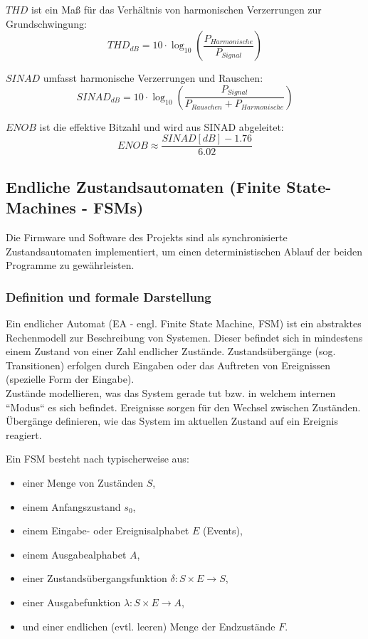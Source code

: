 \documentclass[a4paper, portrait, 12pt]{scrartcl} %
\begin{document}
\textbf{$THD$} ist ein Maß für das Verhältnis von harmonischen Verzerrungen zur Grundschwingung:
\begin{equation}
	THD_{dB}=10\cdot \log_{10}\left( \frac{P_{Harmonische}}{P_{Signal}}\right)
\end{equation}

\textbf{$SINAD$} umfasst harmonische Verzerrungen und Rauschen:
\begin{equation}
	SINAD_{dB}=10\cdot \log_{10}\left( \frac{P_{Signal}}{P_{Rauschen}+P_{Harmonische}}\right)
\end{equation}

\textbf{$ENOB$} ist die effektive Bitzahl und wird aus SINAD abgeleitet:
\begin{equation}
	ENOB\approx \frac{SINAD[dB]-1.76}{6.02}
\end{equation}





\pagebreak

\subsection{Endliche Zustandsautomaten (Finite State-Machines - FSMs)}
Die Firmware und Software des Projekts sind als synchronisierte Zustandsautomaten implementiert, um einen deterministischen Ablauf der beiden Programme zu gewährleisten.
\subsubsection{Definition und formale Darstellung}
Ein endlicher Automat (EA - engl. Finite State Machine, FSM) ist ein abstraktes Rechenmodell zur Beschreibung von Systemen. Dieser befindet sich in mindestens einem Zustand von einer Zahl endlicher Zustände. Zustandsübergänge (sog. Transitionen) erfolgen durch Eingaben oder das Auftreten von Ereignissen (spezielle Form der Eingabe).\\

Zustände modellieren, was das System gerade tut bzw. in welchem internen ``Modus`` es sich befindet. Ereignisse sorgen für den Wechsel zwischen Zuständen. Übergänge definieren, wie das System im aktuellen Zustand auf ein Ereignis reagiert.

Ein FSM besteht nach \cite[S. 7ff]{Baesig2019} typischerweise aus:
\begin{itemize}
	\item einer Menge von Zuständen $S$,
	\item einem Anfangszustand $s_0$,
	\item einem Eingabe- oder Ereignisalphabet $E$ (Events),
	\item einem Ausgabealphabet $A$,
	\item einer Zustandsübergangsfunktion $\delta :S\times E\rightarrow S$,
	\item einer Ausgabefunktion $\lambda :S\times E\rightarrow A$,
	\item und einer endlichen (evtl. leeren) Menge der Endzustände $F$.
\end{itemize}
\end{document}
